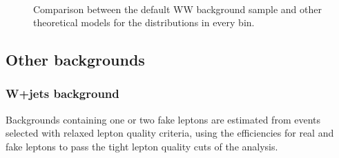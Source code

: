 \begin{figure}[htb]
\\
\caption{Comparison between the default WW background sample and other theoretical models for the \mt distributions in every \pth bin.\label{fig:ww_mth}}
\end{figure}














































\subsection{Other backgrounds\label{sec:OtherBackgrounds}}

	\subsubsection{W+jets background\label{sec:wjetsbkg}}	
Backgrounds containing one or two fake leptons are estimated from events
selected with relaxed lepton quality criteria, using the efficiencies for
real and fake leptons to pass the tight lepton quality cuts of the analysis. 

